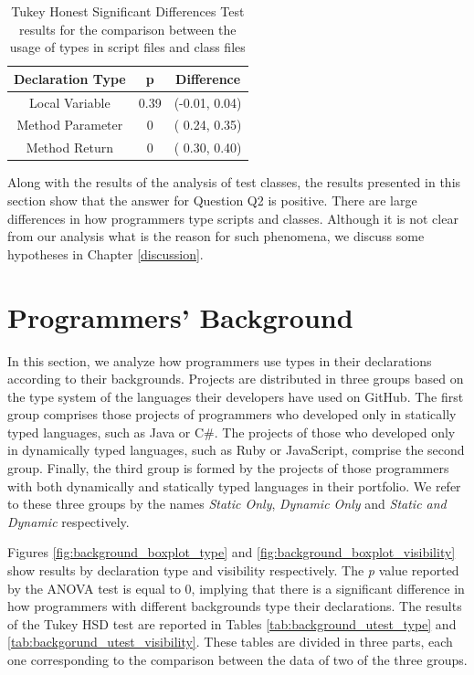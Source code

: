 \documentclass[msc]{ppgccufmg}
\begin{document}
\FloatBarrier
\begin{table}[ht]
\centering{}%

\caption{Tukey Honest Significant Differences Test results for the comparison between the usage of types in script files and class files}
\begin{tabular}{|c|c|c|}
\hline 
Declaration Type & p & Difference \\
\hline 
\hline 
Local Variable   & 0.39 & (-0.01, 0.04) \\ \hline
Method Parameter & 0    & ( 0.24, 0.35) \\ \hline
Method Return    & 0    & ( 0.30, 0.40) \\ \hline
\end{tabular}
\label{tab:script_utest_all}
\end{table}

Along with the results of the analysis of test classes, the results presented in this section show that the answer for Question Q2 is positive.
There are large differences in how programmers type scripts and classes.
Although it is not clear from our analysis what is the reason for such phenomena, we discuss some hypotheses in Chapter \ref{discussion}.




\section{Programmers' Background\label{sec:results-background}}
In this section, we analyze how programmers use types in their declarations according to their backgrounds.
Projects are distributed in three groups based on the type system of the languages their developers have used on GitHub.
The first group comprises those projects of programmers who developed only in statically typed languages, such as Java or C\#.
The projects of those who developed only in dynamically typed languages, such as Ruby or JavaScript, comprise the second group.
Finally, the third group is formed by the projects of those programmers with both dynamically and statically typed languages in their portfolio.
We refer to these three groups by the names \emph{Static Only}, \emph{Dynamic Only} and \emph{Static and Dynamic} respectively.

Figures \ref{fig:background_boxplot_type} and \ref{fig:background_boxplot_visibility}  show results by declaration type and visibility respectively.
The \emph{p} value reported by the ANOVA test is equal to 0, implying that there is a significant difference in how programmers with different backgrounds type their declarations.
The results of the Tukey HSD test are reported in Tables \ref{tab:background_utest_type} and \ref{tab:backgorund_utest_visibility}.
These tables are divided in three parts, each one corresponding to the comparison between the data of two of the three groups.
\end{document}
